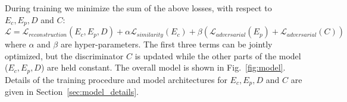 \documentclass{article}
\newcommand{\fig}[1]{Fig.~\ref{fig:#1}}
\newcommand{\secc}[1]{Section~\ref{sec:#1}}
\newcommand{\etal}{\textit{et al}.\:}
\begin{document}
During training we minimize the sum of the above losses, with respect to $E_c, E_p, D$ and $C$:
\begin{equation}
\mathcal{L}  =
\mathcal{L}_{reconstruction}(E_c,E_p,D) + \alpha \mathcal{L}_{similarity}(E_c) + \beta (\mathcal{L}_{adversarial}(E_p) + \mathcal{L}_{adversarial}(C))
\end{equation}
where $\alpha$ and $\beta$ are hyper-parameters. The first three terms can be jointly optimized, but the discriminator $C$ is updated while the other parts of the model ($E_c,E_p,D$) are held constant. The overall model is shown in \fig{model}. Details of the training procedure and model architectures for $E_c, E_p, D$ and $C$ are given in \secc{model_details}.
\end{document}
